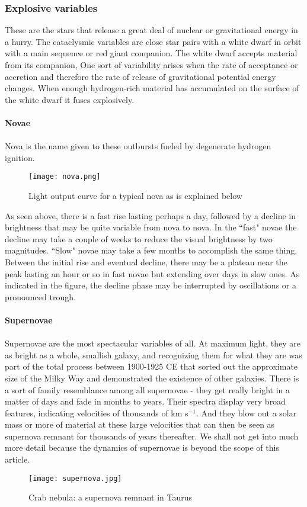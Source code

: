 \subsubsection{Explosive variables}
These are the stars that release a great deal of nuclear or gravitational energy in a hurry. The cataclysmic variables are close star pairs with a white dwarf in orbit with a main sequence or red giant companion. The white dwarf accepts material from its companion, One sort of variability arises when the rate of acceptance or accretion and therefore the rate of release of gravitational potential energy changes. When enough hydrogen-rich material has accumulated on the surface of the white dwarf it fuses explosively.\\\\
\textbf{Novae}\\\\
Nova is the name given to these outbursts fueled by degenerate hydrogen ignition.
\begin{figure}[H]
    \centering
    \color{white}
    \texttt{[image: nova.png]}
    \caption{Light output curve for a typical nova as is explained below}
    \label{fig:my_label}
\end{figure}
\noindent
As seen above, there is a fast rise lasting perhaps a day, followed by a decline in brightness that may be quite variable from nova to nova. In the ``fast" novae the decline may take a couple of weeks to reduce the visual brightness by two magnitudes. ``Slow" novae may take a few months to accomplish the same thing. Between the initial rise and eventual decline, there may be a plateau near the peak lasting an hour or so in fast novae but extending over days in slow ones. As indicated in the figure, the decline phase may be interrupted by oscillations or a pronounced trough. \\\\
\textbf{Supernovae}\\\\
Supernovae are the most spectacular variables of all. At maximum light, they are as bright as a whole, smallish galaxy, and recognizing them for what they are was part of the total process between 1900-1925 CE that sorted out the approximate size of the Milky Way and demonstrated the existence of other galaxies. There is a sort of family resemblance among all supernovae - they get really bright in a matter of days and fade in months to years. Their spectra display very broad features, indicating velocities of thousands of km s$^{-1}$. And they blow out a solar mass or more of material at these large velocities that can then be seen as supernova remnant for thousands of years thereafter. We shall not get into much more detail because the dynamics of supernovae is beyond the scope of this article.
\begin{figure}[H]
    \centering
    \color{white}
    \texttt{[image: supernova.jpg]}
    \caption{Crab nebula: a supernova remnant in Taurus}
    \label{fig:my_label}
\end{figure}
\noindent

